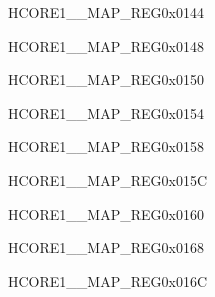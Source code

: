 \begin{register}{H}{CORE1\_\_MAP\_REG}{0x0144}\label{regdesc:CORE1CPUINTFROMCPU2MAPREG}
\end{register}\vspace{-3em}


\begin{register}{H}{CORE1\_\_MAP\_REG}{0x0148}\label{regdesc:CORE1CPUINTFROMCPU3MAPREG}
\end{register}\vspace{-3em}


\begin{register}{H}{CORE1\_\_MAP\_REG}{0x0150}\label{regdesc:CORE1FLASHMSPIINTMAPREG}
\end{register}\vspace{-3em}


\begin{register}{H}{CORE1\_\_MAP\_REG}{0x0154}\label{regdesc:CORE1CSIBRIDGEINTMAPREG}
\end{register}\vspace{-3em}


\begin{register}{H}{CORE1\_\_MAP\_REG}{0x0158}\label{regdesc:CORE1DSIBRIDGEINTMAPREG}
\end{register}\vspace{-3em}


\begin{register}{H}{CORE1\_\_MAP\_REG}{0x015C}\label{regdesc:CORE1CSIINTMAPREG}
\end{register}\vspace{-3em}


\begin{register}{H}{CORE1\_\_MAP\_REG}{0x0160}\label{regdesc:CORE1DSIINTMAPREG}
\end{register}\vspace{-3em}


\begin{register}{H}{CORE1\_\_MAP\_REG}{0x0168}\label{regdesc:CORE1LPIINTMAPREG}
\end{register}\vspace{-3em}


\begin{register}{H}{CORE1\_\_MAP\_REG}{0x016C}\label{regdesc:CORE1PMTINTMAPREG}
\end{register}\vspace{-3em}


